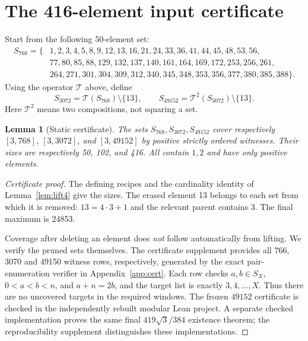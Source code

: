 \documentclass[11pt]{article}
\newtheorem{lemma}[theorem]{Lemma}
\theoremstyle{definition}\newtheorem{definition}[theorem]{Definition}
\theoremstyle{remark}\newtheorem{remark}[theorem]{Remark}
\numberwithin{equation}{section}
\newcommand{\lf}{\mathcal T}
\begin{document}
\section{The 416-element input certificate}\label{sec:certificate}
Start from the following 50-element set:
\begin{equation}\label{eq:S768}
\begin{split}
S_{768}=\{&1,2,3,4,5,8,9,12,13,16,21,24,33,36,41,44,45,48,53,56,\\
&77,80,85,88,129,132,137,140,161,164,169,172,253,256,261,\\
&264,271,301,304,309,312,340,345,348,353,356,377,380,385,388\}.
\end{split}
\end{equation}
Using the operator $\lf$ above, define
\begin{equation}\label{eq:pruning}
S_{3072}=\lf(S_{768})\setminus\{13\},\qquad
S_{49152}=\lf^2(S_{3072})\setminus\{13\}.
\end{equation}
Here $\lf^2$ means two compositions, not squaring a set.

\begin{lemma}[Static certificate]\label{lem:static}
The sets $S_{768},S_{3072},S_{49152}$ cover respectively $[3,768]$, $[3,3072]$, and $[3,49152]$ by positive strictly ordered witnesses. Their sizes are respectively 50, 102, and 416. All contain $1,2$ and have only positive elements.
\end{lemma}
\begin{proof}[Certificate proof]
The defining recipes and the cardinality identity of Lemma~\ref{lem:lift4} give the sizes. The erased element 13 belongs to each set from which it is removed: $13=4\cdot3+1$ and the relevant parent contains 3. The final maximum is 24853.

Coverage after deleting an element does \emph{not} follow automatically from lifting. We verify the pruned sets themselves. The certificate supplement provides all 766, 3070 and 49150 witness rows, respectively, generated by the exact pair-enumeration verifier in Appendix~\ref{app:cert}. Each row checks $a,b\in S_X$, $0<a<b<n$, and $a+n=2b$, and the target list is exactly $3,4,\ldots,X$. Thus there are no uncovered targets in the required windows. The frozen $49152$ certificate is checked in the independently rebuilt modular Lean project. A separate checked implementation proves the same final $419\sqrt3/384$ existence theorem; the reproducibility supplement distinguishes these implementations.
\end{proof}
\end{document}

